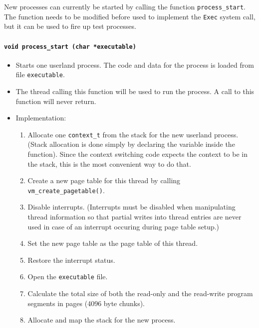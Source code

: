\documentclass[twoside,a4paper]{report}
\makeatletter
\newenvironment{function}[3]{%
\paragraph{\texttt{#1 {\textbf{#2}} (#3)}}%
\index{#2@\texttt{#2}}%
\begin{itemize}%
}{%
\end{itemize}%
}
\makeatother
\begin{document}

New processes can currently be started by calling the function
\texttt{process\_start}. The function needs to be modified before used
to implement the \texttt{Exec} system call, but it can be used to fire
up test processes.

\begin{function}{void}{process\_start}{char *executable}

\item Starts one userland process. The code and data for the process
is loaded from file \texttt{executable}.

\item The thread calling this function will be used to run the
process. A call to this function will never return.

\item{Implementation:}

\begin{enumerate}

\item Allocate one \texttt{context\_t}
 from the stack for the new
userland process. (Stack allocation is done simply by declaring the
variable inside the function). Since the context switching code
expects the context to be in the stack, this is the most convenient
way to do that.

\item Create a new page table for this thread by calling
\texttt{vm\_create\_pagetable()}.

\item Disable interrupts. (Interrupts must be disabled when
manipulating thread information so that partial writes into thread
entries are never used in case of an interrupt occuring during page
table setup.)

\item Set the new page table as the page table of this thread.

\item Restore the interrupt status.

\item Open the \texttt{executable} file.

\item Calculate the total size of both the read-only and the
read-write program segments in pages (4096 byte chunks).

\item Allocate and map the stack for the new process.


\end{enumerate}
\end{function}
\end{document}
